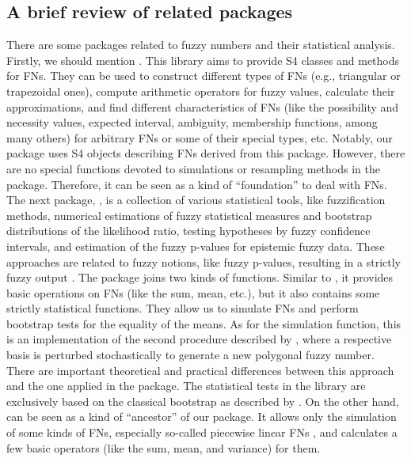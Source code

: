 \subsection{A brief review of related packages}
There are some packages related to fuzzy numbers and their statistical analysis.
Firstly, we should mention  \citep{FuzzyNumbersMan}.
This library aims to provide S4 classes and methods for FNs.
They can be used to construct different types of FNs (e.g., triangular or trapezoidal ones), compute arithmetic operators for fuzzy values, calculate their approximations, and find different characteristics of FNs (like the possibility and necessity values, expected interval, ambiguity, membership functions, among many others) for arbitrary FNs or some of their special types, etc.
Notably, our package  uses S4 objects describing FNs derived from this package.
However, there are no special functions devoted to simulations or resampling methods in the  package.
Therefore, it can be seen as a kind of ``foundation'' to deal with FNs.
The next package,  \citep{FuzzySTsMan}, is a collection of various statistical tools, like fuzzification methods, numerical estimations of fuzzy statistical measures and bootstrap distributions of the likelihood ratio, testing hypotheses by fuzzy confidence intervals, and estimation of the fuzzy p-values for epistemic fuzzy data.
These approaches are related to fuzzy notions, like fuzzy p-values, resulting in a strictly fuzzy output \citep{Berkachy2019}.
The  \citep{Trutschnig2013} package joins two kinds of functions.
Similar to , it provides basic operations on FNs (like the sum, mean, etc.), but it also contains some strictly statistical functions.
They allow us to simulate FNs and perform bootstrap tests for the equality of the means.
As for the simulation function, this is an implementation of the second procedure described by \cite{GONZALEZRODRIGUEZ2009642}, where a respective basis is perturbed stochastically to generate a new polygonal fuzzy number.
There are important theoretical and practical differences \citep{FRV} between this approach and the one applied in the  package.
The statistical tests in the  library are exclusively based on the classical bootstrap as described by \cite{COLUBI2009344,Montenegro2004}.
On the other hand,  \citep{SimPLFNMan} can be seen as a kind of ``ancestor'' of our package.
It allows only the simulation of some kinds of FNs, especially so-called piecewise linear FNs \citep{COROIANU201326}, and calculates a few basic operators (like the sum, mean, and variance) for them.
